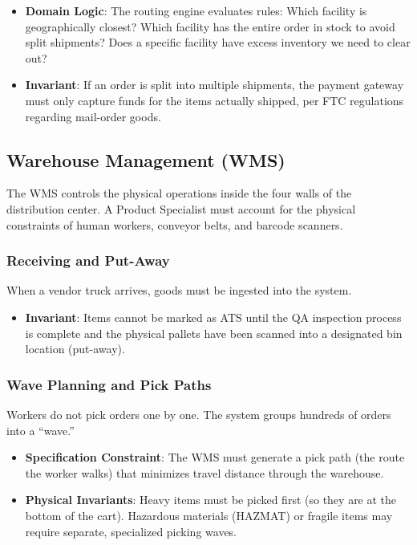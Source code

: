 \documentclass[
  11pt,
  openany,
  oneside]{book}
\providecommand{\tightlist}{%
  \setlength{\itemsep}{0pt}\setlength{\parskip}{0pt}}
\begin{document}
\begin{itemize}
\tightlist
\item
  \textbf{Domain Logic}: The routing engine evaluates rules: Which
  facility is geographically closest? Which facility has the entire
  order in stock to avoid split shipments? Does a specific facility have
  excess inventory we need to clear out?
\item
  \textbf{Invariant}: If an order is split into multiple shipments, the
  payment gateway must only capture funds for the items actually
  shipped, per FTC regulations regarding mail-order goods.
\end{itemize}

\subsection{Warehouse Management (WMS)}\label{warehouse-management-wms}

The WMS controls the physical operations inside the four walls of the
distribution center. A Product Specialist must account for the physical
constraints of human workers, conveyor belts, and barcode scanners.

\subsubsection{Receiving and Put-Away}\label{receiving-and-put-away}

When a vendor truck arrives, goods must be ingested into the system.

\begin{itemize}
\tightlist
\item
  \textbf{Invariant}: Items cannot be marked as ATS until the QA
  inspection process is complete and the physical pallets have been
  scanned into a designated bin location (put-away).
\end{itemize}

\subsubsection{Wave Planning and Pick
Paths}\label{wave-planning-and-pick-paths}

Workers do not pick orders one by one. The system groups hundreds of
orders into a ``wave.''

\begin{itemize}
\tightlist
\item
  \textbf{Specification Constraint}: The WMS must generate a pick path
  (the route the worker walks) that minimizes travel distance through
  the warehouse.
\item
  \textbf{Physical Invariants}: Heavy items must be picked first (so
  they are at the bottom of the cart). Hazardous materials (HAZMAT) or
  fragile items may require separate, specialized picking waves.
\end{itemize}
\end{document}
